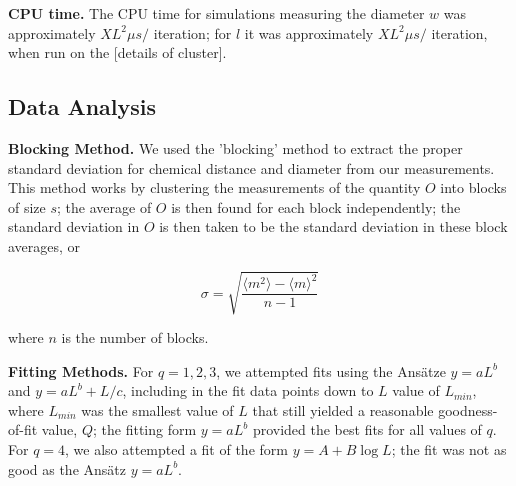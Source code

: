 \documentclass[pre,preprint,11pt]{revtex4}
\newcommand{\lb}{{\langle}}
\newcommand{\rb}{{\rangle}}
\begin{document}
{\bf CPU time.} The CPU time for simulations measuring the diameter $w$ was approximately $X L^2 \mu s /$ iteration; for $l$ it was approximately $X L^2 \mu s /$ iteration, when run on the [details of cluster].







\subsection{Data Analysis}

{\bf Blocking Method.} We used the 'blocking' method \cite{NeBa99} to extract the proper standard deviation for chemical distance and diameter from our measurements.  This method works by clustering the measurements of the quantity $O$ into blocks of size $s$; the average of $O$ is then found for each block independently;  the standard deviation in $O$ is then taken to be the standard deviation in these block averages, or

\begin {equation}
\sigma=\sqrt{ \frac{\lb m^2 \rb - \lb m \rb ^2}{n-1}}
\end {equation}

where $n$ is the number of blocks. 


{\bf Fitting Methods.}
For $q=1,2,3$, we attempted fits using the Ans\"{a}tze $y=aL^b$ and $y=aL^b+L/c$, including in the fit data points down to $L$ value of $L_{min}$, where $L_{min}$ was the smallest value of $L$ that still yielded a reasonable goodness-of-fit value, $Q$;  the fitting form $y=aL^b$ provided the best fits for all values of $q$.  For $q=4$, we also attempted a fit of the form $y=A+B \log L$; the fit was not as good as the Ans\"{a}tz $y=aL^b$.
\end{document}
